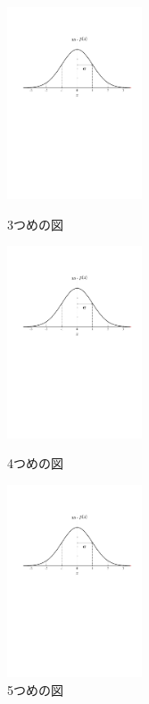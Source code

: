 \documentclass[a4paper,11pt,dvipdfmx]{jarticle}
\begin{document}
\begin{figure}[htbp]
 \begin{minipage}{0.33\hsize}
  \begin{center}
   \includegraphics[width=40mm]{gauss001.pdf}
  \end{center}
  \caption{3つめの図}
  \label{fig:three}
 \end{minipage}
 \begin{minipage}{0.33\hsize}
 \begin{center}
  \includegraphics[width=40mm]{gauss001.pdf}
 \end{center}
  \caption{4つめの図}
  \label{fig:four}
 \end{minipage}
 \begin{minipage}{0.33\hsize}
 \begin{center}
  \includegraphics[width=40mm]{gauss001.pdf}
 \end{center}
  \caption{5つめの図}
  \label{fig:five}
 \end{minipage}
\end{figure}
\end{document}
